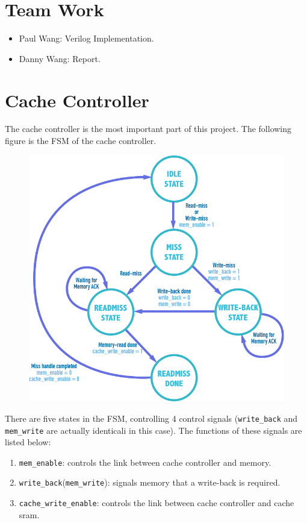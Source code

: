 \section{Team Work}

\begin{itemize}
  \item Paul Wang: Verilog Implementation.
  \item Danny Wang: Report.
\end{itemize}

\section{Cache Controller}

The cache controller is the most important part of this project. The following figure is the FSM of the cache controller.

\begin{figure}[h!]
  \centering
  \includegraphics[width=.8\textwidth]{state.png}
\end{figure}

There are five states in the FSM, controlling 4 control signals (\texttt{write\_back} and \texttt{mem\_write} are actually identicali in this case). The functions of these signals are listed below:

\begin{enumerate}
  \item \texttt{mem\_enable}: controls the link between cache controller and memory.
  \item \texttt{write\_back}(\texttt{mem\_write}): signals memory that a write-back is required.
  \item \texttt{cache\_write\_enable}: controls the link between cache controller and cache sram.
\end{enumerate}

